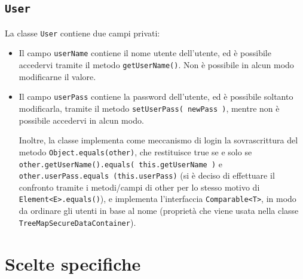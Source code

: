 \documentclass{article}
\begin{document}
\subsection{\texttt{User}}
La classe \texttt{User} contiene due campi privati:
\begin{itemize}
\item Il campo \texttt{userName} contiene il nome utente dell'utente, ed è possibile accedervi tramite il metodo \texttt{getUserName()}. Non è possibile in alcun modo modificarne il valore.

\item Il campo \texttt{userPass} contiene la password dell'utente, ed è possibile soltanto modificarla,  tramite il metodo \texttt{setUserPass( newPass )}, mentre non è possibile accedervi in alcun modo.

Inoltre, la classe implementa come meccanismo di login la sovrascrittura del metodo \texttt{Object.equals(other)}, che restituisce true se e solo se \texttt{other.getUserName().equals( this.getUserName )} e \texttt{other.userPass.equals (this.userPass)} (si è deciso di effettuare il confronto tramite i metodi/campi di other per lo stesso motivo di  \texttt{Element<E>.equals()}), e implementa l'interfaccia \texttt{Comparable<T>}, in modo da ordinare gli utenti in base al nome (proprietà che viene usata nella classe \texttt{TreeMapSecureDataContainer}).
\end{itemize}

\section{Scelte specifiche}
\end{document}
